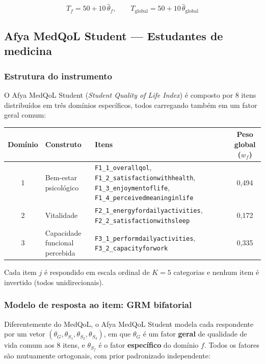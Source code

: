 \documentclass[12pt,a4paper]{article}
\begin{document}
\begin{equation}
T_f = 50 + 10\,\hat\theta_f, \qquad
T_{\text{global}} = 50 + 10\,\hat\theta_{\text{global}}
\label{eq:medqol-tscore}
\end{equation}

\subsection{Afya MedQoL Student --- Estudantes de medicina}
\label{sec:iqol}

\subsubsection{Estrutura do instrumento}

O Afya MedQoL Student (\emph{Student Quality of Life Index}) é composto por 8 itens
distribuídos em três domínios específicos, todos carregando também em um
fator geral comum:

\begin{table}[h]
\centering
\begin{tabular}{@{}cllc@{}}
\toprule
Domínio & Construto & Itens & Peso global ($w_f$) \\
\midrule
1 & Bem-estar psicológico & \texttt{F1\_1\_overallqol}, \texttt{F1\_2\_satisfactionwithhealth}, \texttt{F1\_3\_enjoymentoflife}, \texttt{F1\_4\_perceivedmeaninginlife} & 0,494 \\
2 & Vitalidade & \texttt{F2\_1\_energyfordailyactivities}, \texttt{F2\_2\_satisfactionwithsleep} & 0,172 \\
3 & Capacidade funcional percebida & \texttt{F3\_1\_performdailyactivities}, \texttt{F3\_2\_capacityforwork} & 0,335 \\
\bottomrule
\end{tabular}
\end{table}

Cada item $j$ é respondido em escala ordinal de $K=5$ categorias e nenhum
item é invertido (todos unidirecionais).

\subsubsection{Modelo de resposta ao item: GRM bifatorial}

Diferentemente do MedQoL, o Afya MedQoL Student modela cada respondente por um vetor
$(\theta_G, \theta_{S_1}, \theta_{S_2}, \theta_{S_3})$, em que $\theta_G$ é um
fator \textbf{geral} de qualidade de vida comum aos 8 itens, e $\theta_{S_f}$
é o fator \textbf{específico} do domínio $f$. Todos os fatores são
mutuamente ortogonais, com prior padronizado independente:
\end{document}
